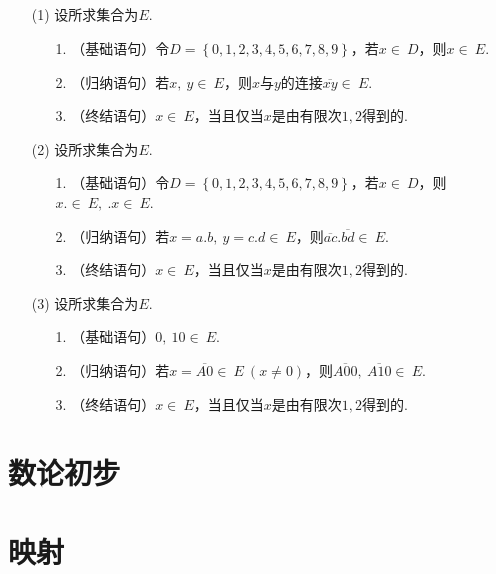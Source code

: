 \documentclass[UTF8]{ctexart}
\begin{document}
\subsection{}   %
\begin{enumerate}
    \item [(1)]设所求集合为$E$.
    \begin{enumerate}
        \item [1.]（基础语句）令$D=\left\{0,1,2,3,4,5,6,7,8,9\right\}$，若$x\in\ D$，则$x\in\ E$.
        \item [2.]（归纳语句）若$x,\ y\in\ E$，则$x$与$y$的连接$\overline{xy}\in\ E$.
        \item [3.]（终结语句）$x\in \ E$，当且仅当$x$是由有限次$1,2$得到的.
    \end{enumerate}

    \item [(2)]设所求集合为$E$.
    \begin{enumerate}
        \item [1.]（基础语句）令$D=\left\{0,1,2,3,4,5,6,7,8,9\right\}$，若$x\in\ D$，则$x.\in\ E,\ .x\in\ E$.
        \item [2.]（归纳语句）若$x=a.b,\ y=c.d\in\ E$，则$\overline{ac} . \overline{bd}\in\ E$.
        \item [3.]（终结语句）$x\in \ E$，当且仅当$x$是由有限次$1,2$得到的.
    \end{enumerate}

    \item [(3)]设所求集合为$E$.
    \begin{enumerate}
        \item [1.]（基础语句）$0,\ 10\in\ E$.
        \item [2.]（归纳语句）若$x=\overline{A0}\in\ E\ (x\neq 0)$，则$\overline{A00},\ \overline{A10}\in \ E$.
        \item [3.]（终结语句）$x\in \ E$，当且仅当$x$是由有限次$1,2$得到的.
    \end{enumerate}
\end{enumerate}

\newpage

\section{数论初步}

\newpage

\section{映射}
\end{document}
